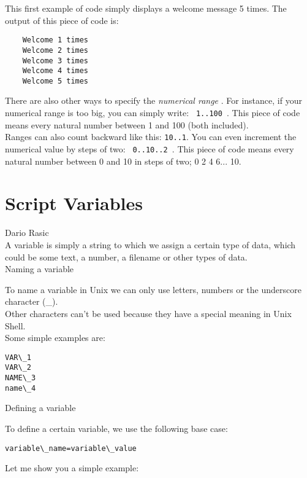 \documentclass[hidelinks,12pt,a4paper,numbers=enddot]{scrartcl}
\begin{document}
This first example of code simply displays a welcome message 5 times.
The output of this piece of code is:
\begin{verbatim}
    Welcome 1 times
    Welcome 2 times
    Welcome 3 times
    Welcome 4 times
    Welcome 5 times
\end{verbatim}



There are also other ways to specify the \emph{ numerical range }. For instance, if
your numerical range is too big, you can simply write: \texttt{ {1..100} }. This piece
of code means every natural number between 1 and 100 (both included). \\
Ranges can also count backward like this: \texttt{{10..1}}.
You can even increment the numerical value by steps of two: \texttt{ {0..10..2} }.
This piece of code means every natural number between 0 and 10 in steps of two;
0 2 4 6... 10.


\section{Script Variables}


\large Dario Rasic \normalsize\\



A variable is simply a string to which we assign a certain type of data,
which could be some text, a number, a filename or other types of data.\\


Naming a variable


To name a variable in Unix we can only use letters, numbers or
the underscore character (\_).\\
Other characters can't be used because they have a special meaning in Unix Shell.\\

Some simple examples are:

\begin{verbatim}
VAR\_1
VAR\_2
NAME\_3
name\_4
\end{verbatim}


Defining a variable

To define a certain variable, we use the following base case:

\begin{verbatim}
variable\_name=variable\_value
\end{verbatim}


Let me show you a simple example:
\end{document}
